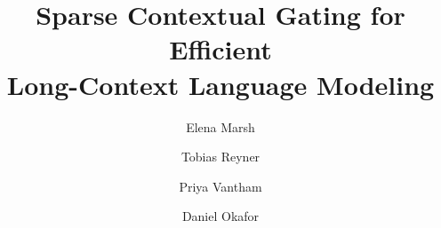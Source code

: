 \usepackage[letterpaper,margin=0.78in,columnsep=0.28in]{geometry}
\usepackage[utf8]{inputenc}
\usepackage[T1]{fontenc}
\usepackage{filecontents}
\usepackage{amsmath}
\usepackage{amssymb}
\usepackage{booktabs}
\usepackage[table]{xcolor}
\usepackage{graphicx}
\usepackage{tikz}
\usepackage{pgfplots}
\pgfplotsset{compat=1.17}
\usetikzlibrary{positioning,calc,shapes.geometric,backgrounds}
\usepackage[most]{tcolorbox}
\usepackage{enumitem}
\usepackage{caption}
\usepackage{authblk}
\usepackage[colorlinks=true,linkcolor=colmnavy,citecolor=colmnavy,urlcolor=colmteal]{hyperref}


\renewcommand{\Authfont}{\bfseries}
\renewcommand{\Affilfont}{\normalfont\itshape\small\color{colmgray}}
\setlength{\affilsep}{4pt}



\title{\vspace{-0.4em}\textbf{\Large Sparse Contextual Gating for Efficient\\ Long-Context Language Modeling}}

\author[1]{Elena Marsh}
\author[2]{Tobias Reyner}
\author[3]{Priya Vantham}
\author[4]{Daniel Okafor}


\date{}
